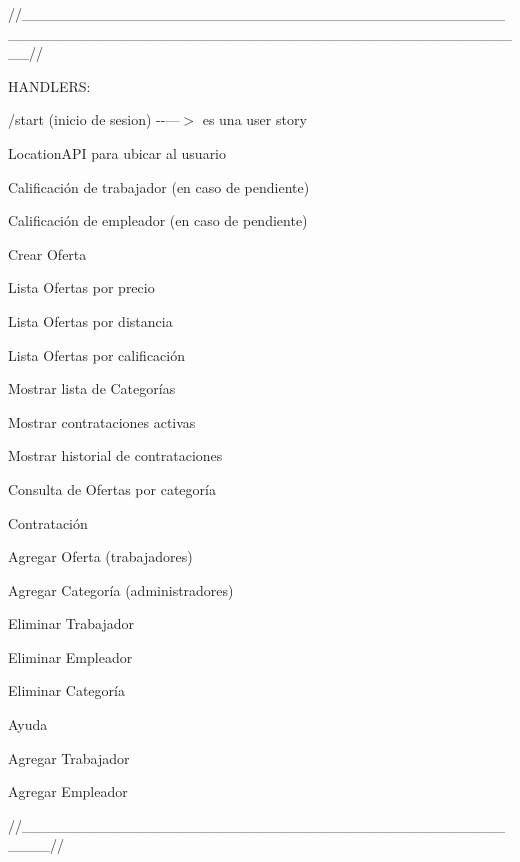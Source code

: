 //\+\_\+\+\_\+\+\_\+\+\_\+\+\_\+\+\_\+\+\_\+\+\_\+\+\_\+\+\_\+\+\_\+\+\_\+\+\_\+\+\_\+\+\_\+\+\_\+\+\_\+\+\_\+\+\_\+\+\_\+\+\_\+\+\_\+\+\_\+\+\_\+\+\_\+\+\_\+\+\_\+\+\_\+\+\_\+\+\_\+\+\_\+\+\_\+\+\_\+\+\_\+\+\_\+\+\_\+\+\_\+\+\_\+\+\_\+\+\_\+\+\_\+\+\_\+\+\_\+\+\_\+\+\_\+\+\_\+\+\_\+\+\_\+\+\_\+\+\_\+\+\_\+\+\_\+\+\_\+\+\_\+\+\_\+\+\_\+\+\_\+\+\_\+\+\_\+\+\_\+\+\_\+\+\_\+\+\_\+\+\_\+\+\_\+\+\_\+\+\_\+\+\_\+\+\_\+\+\_\+\+\_\+\+\_\+\+\_\+\+\_\+\+\_\+\+\_\+\+\_\+\+\_\+\+\_\+\+\_\+\+\_\+\+\_\+\+\_\+\+\_\+\+\_\+\+\_\+\+\_\+\+\_\+\+\_\+\+\_\+\+\_\+\+\_\+\+\_\+\+\_\+\+\_\+\+\_\+//

HANDLERS\+:


\begin{DoxyItemize}
\item /start (inicio de sesion) -\/-\/---\texorpdfstring{$>$}{>} es una user story
\item Location\+API para ubicar al usuario
\item Calificación de trabajador (en caso de pendiente)
\item Calificación de empleador (en caso de pendiente)
\item Crear Oferta
\item Lista Ofertas por precio
\item Lista Ofertas por distancia
\item Lista Ofertas por calificación
\item Mostrar lista de Categorías
\item Mostrar contrataciones activas
\item Mostrar historial de contrataciones
\item Consulta de Ofertas por categoría
\item Contratación
\item Agregar Oferta (trabajadores)
\item Agregar Categoría (administradores)
\item Eliminar Trabajador
\item Eliminar Empleador
\item Eliminar Categoría
\item Ayuda
\item Agregar Trabajador
\item Agregar Empleador
\end{DoxyItemize}

//\+\_\+\+\_\+\+\_\+\+\_\+\+\_\+\+\_\+\+\_\+\+\_\+\+\_\+\+\_\+\+\_\+\+\_\+\+\_\+\+\_\+\+\_\+\+\_\+\+\_\+\+\_\+\+\_\+\+\_\+\+\_\+\+\_\+\+\_\+\+\_\+\+\_\+\+\_\+\+\_\+\+\_\+\+\_\+\+\_\+\+\_\+\+\_\+\+\_\+\+\_\+\+\_\+\+\_\+\+\_\+\+\_\+\+\_\+\+\_\+\+\_\+\+\_\+\+\_\+\+\_\+\+\_\+\+\_\+\+\_\+\+\_\+\+\_\+\+\_\+//

